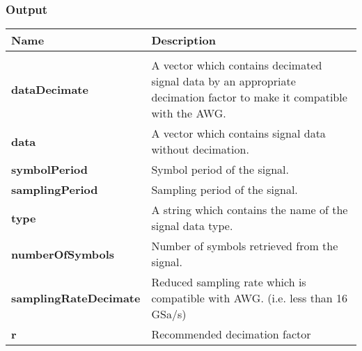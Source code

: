 \subsubsection*{Output}
\begin{tabular}{|p{4cm}||p{10cm}|}
	\hline
	\textbf{Name} &\textbf{Description}\\
	\hline
	\vspace{0.1cm}& \vspace{0.1cm}\\
	\textbf{dataDecimate} \vspace{0.25cm}& A vector which contains decimated signal data by an appropriate decimation factor to make it compatible with the AWG. \vspace{0.25cm}\\
	
	\textbf{data} \vspace{0.25cm}& A vector which contains signal data without decimation. \vspace{0.25cm}\\
	
	\textbf{symbolPeriod}\vspace{0.25cm}& Symbol period of the signal.\vspace{0.25cm}\\
	
	\textbf{samplingPeriod}\vspace{0.25cm}& Sampling period of the signal.\vspace{0.25cm}\\
		
	\textbf{type}\vspace{0.25cm}& A string which contains the name of the signal data type.\vspace{0.25cm}\\
			
	\textbf{numberOfSymbols}\vspace{0.25cm}& Number of symbols retrieved from the signal.\vspace{0.25cm}\\
	
	\textbf{samplingRateDecimate}\vspace{0.25cm}& Reduced sampling rate which is compatible with AWG. (i.e. less than 16 GSa/s)\vspace{0.25cm}\\
	
	\textbf{r}\vspace{0.25cm}&Recommended decimation factor\vspace{0.25cm}\\
	\hline
\end{tabular}
